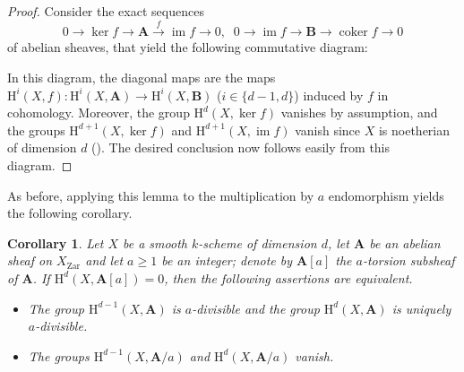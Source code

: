 \documentclass[11pt,leqno]{amsart}
\newcommand{\coker}{\operatorname{coker}}
\renewcommand{\1}{{\rm 1\hspace*{-0.4ex}%
\rule{0.1ex}{1.52ex}\hspace*{0.2ex}}}
\newcommand{\Zar}{\operatorname{Zar}} %
\newcommand{\Hr}{{\mathrm {H}}}
\newcommand{\<}[1]{{\langle}#1 {\rangle}}
\newcommand{\Abf}{\mathbf{A}}
\newcommand{\Bbf}{\mathbf{B}}
\newcommand{\im}{\operatorname{im}}
\theoremstyle{plain}
\newtheorem{cor}[thm]{Corollary}
\theoremstyle{definition}
\theoremstyle{remark}
\numberwithin{equation}{section}
\begin{document}
\begin{proof}
Consider the exact sequences \[0\rightarrow\ker f\rightarrow\Abf\xrightarrow{f}\im f\rightarrow 0,\;\;0\rightarrow\im f\rightarrow\Bbf\rightarrow\coker f\rightarrow 0\] of abelian sheaves, that yield the following commutative diagram:
\begin{center}
\end{center} 
In this diagram, the diagonal maps are the maps $\Hr^i(X,f):\Hr^i(X,\Abf)\rightarrow\Hr^i(X,\Bbf)$ ($i\in\{d-1,d\}$) induced by $f$ in cohomology. Moreover, the group $\Hr^d(X,\ker f)$ vanishes by assumption, and the groups $\Hr^{d+1}(X,\ker f)$ and $\Hr^{d+1}(X,\im f)$ vanish since $X$ is noetherian of dimension $d$ (\cite[Théorème 3.6.5]{grothendieckQuelquesPointsDalgebre1957}). The desired conclusion now follows easily from this diagram.
\end{proof}

As before, applying this lemma to the multiplication by $a$ endomorphism yields the following corollary.

\begin{cor}\label{cor:divisibility_vanishing_multiplication_by_n}
Let $X$ be a smooth $k$-scheme of dimension $d$, let $\Abf$ be an abelian sheaf on $X_{\Zar}$ and let $a\geq 1$ be an integer; denote by $\Abf[a]$ the $a$-torsion subsheaf of $\Abf$. If $\Hr^d(X,\Abf[a])=0$, then the following assertions are equivalent.
\begin{itemize}
	\item[(1)] The group $\Hr^{d-1}(X,\Abf)$ is $a$-divisible and the group $\Hr^d(X,\Abf)$ is uniquely $a$-divisible.
	\item[(2)] The groups $\Hr^{d-1}(X,\Abf/a)$ and $\Hr^{d}(X,\Abf/a)$ vanish.
\end{itemize}
\vspace{-\itemsep}\vspace{-\itemsep}
\end{cor}
\end{document}

